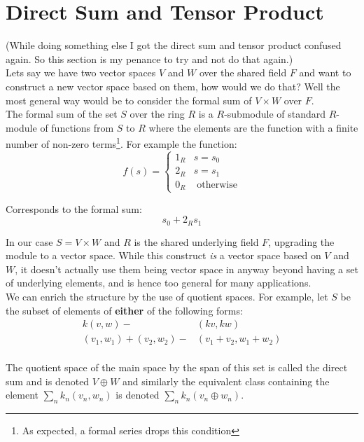 
\section{Direct Sum and Tensor Product}
(While doing something else I got the direct sum and tensor product confused again.
So this section is my penance to try and not do that again.)
\\

Lets say we have two vector spaces $V$ and $W$ over the shared field $F$ and want to construct a new vector space based on them,
how would we do that?
Well the most general way would be to consider the formal sum of $V\times W$ over $F$.
\\

The formal sum of the set $S$ over the ring $R$ is a $R$-submodule of standard $R$-module of functions from $S$ to $R$ where the elements are the function  with a finite number of non-zero terms\footnote{As expected, a formal series drops this condition}.
For example the function:
\[f(s) = \begin{cases} 1_R & s=s_0\\ 2_R & s=s_1\\ 0_R & \text{ otherwise} \end{cases}\]

Corresponds to the formal sum:
\[s_0+2_Rs_1\]

In our case $S=V\times W$ and $R$ is the shared underlying field $F$,
upgrading the module to a vector space.
While this construct {\em is} a vector space based on $V$ and $W$,
it doesn't actually use them being vector space in anyway beyond having a set of underlying elements,
and is hence too general for many applications.
\\

We can enrich the structure by the use of quotient spaces.
For example,
let $S$ be the subset of elements of {\bf either} of the following forms:
\begin{equation*}
\begin{aligned}
	k(v,w) -& (kv,kw)\\
	(v_1,w_1)+(v_2,w_2) -& (v_1+v_2,w_1+w_2)\\
\end{aligned}
\end{equation*}

The quotient space of the main space by the span of this set is called the direct sum and is denoted $V\oplus W$ and similarly the equivalent class containing the element $\sum_nk_n(v_n,w_n)$ is denoted $\sum_nk_n(v_n\oplus w_n)$.
\\

